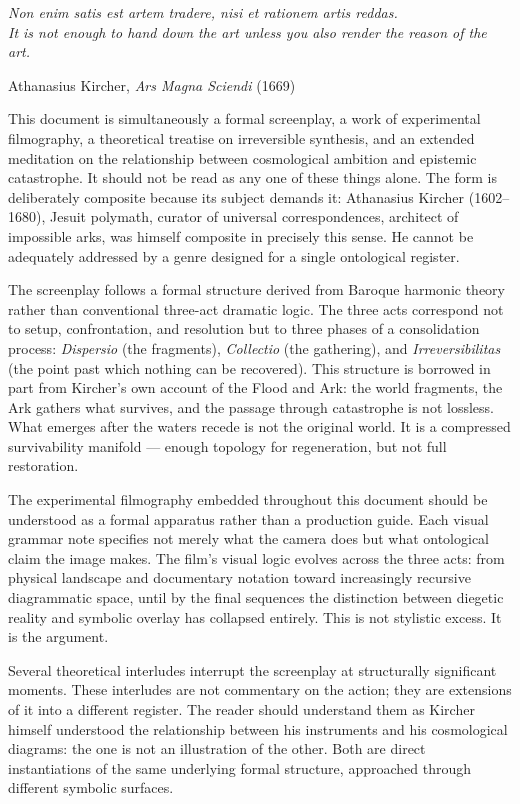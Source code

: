 \documentclass[12pt, a4paper, twoside]{memoir}
\theoremstyle{definition}
\theoremstyle{remark}
\begin{document}
\epigraph{\itshape Non enim satis est artem tradere, nisi et rationem artis reddas.\\
It is not enough to hand down the art unless you also render the reason of the art.}{Athanasius Kircher, \textit{Ars Magna Sciendi} (1669)}

This document is simultaneously a formal screenplay, a work of experimental filmography, a theoretical treatise on irreversible synthesis, and an extended meditation on the relationship between cosmological ambition and epistemic catastrophe. It should not be read as any one of these things alone. The form is deliberately composite because its subject demands it: Athanasius Kircher (1602--1680), Jesuit polymath, curator of universal correspondences, architect of impossible arks, was himself composite in precisely this sense. He cannot be adequately addressed by a genre designed for a single ontological register.

The screenplay follows a formal structure derived from Baroque harmonic theory rather than conventional three-act dramatic logic. The three acts correspond not to setup, confrontation, and resolution but to three phases of a consolidation process: \textit{Dispersio} (the fragments), \textit{Collectio} (the gathering), and \textit{Irreversibilitas} (the point past which nothing can be recovered). This structure is borrowed in part from Kircher's own account of the Flood and Ark: the world fragments, the Ark gathers what survives, and the passage through catastrophe is not lossless. What emerges after the waters recede is not the original world. It is a compressed survivability manifold --- enough topology for regeneration, but not full restoration.

The experimental filmography embedded throughout this document should be understood as a formal apparatus rather than a production guide. Each visual grammar note specifies not merely what the camera does but what ontological claim the image makes. The film's visual logic evolves across the three acts: from physical landscape and documentary notation toward increasingly recursive diagrammatic space, until by the final sequences the distinction between diegetic reality and symbolic overlay has collapsed entirely. This is not stylistic excess. It is the argument.

Several theoretical interludes interrupt the screenplay at structurally significant moments. These interludes are not commentary on the action; they are extensions of it into a different register. The reader should understand them as Kircher himself understood the relationship between his instruments and his cosmological diagrams: the one is not an illustration of the other. Both are direct instantiations of the same underlying formal structure, approached through different symbolic surfaces.
\end{document}
